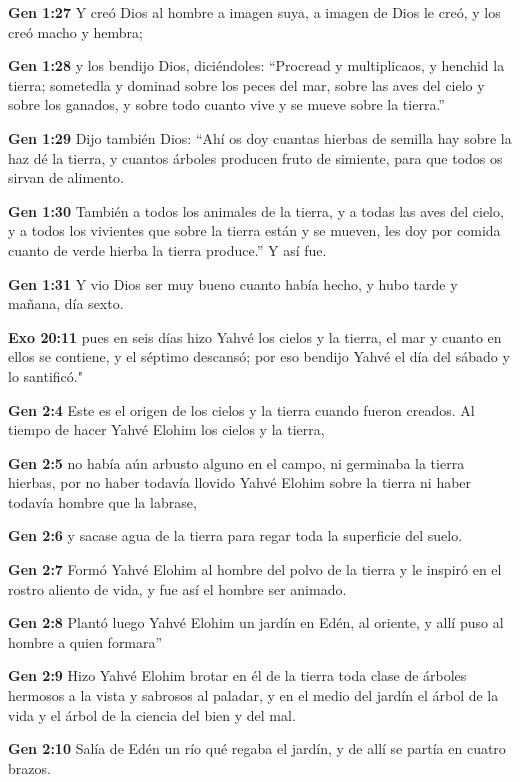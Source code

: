 \textbf{Gen 1:27} Y creó Dios al hombre a imagen suya, a imagen de Dios le creó, y los creó macho y hembra; 

\textbf{Gen 1:28} y los bendijo Dios, diciéndoles: “Procread y multiplicaos, y henchid la tierra; sometedla y dominad sobre los peces del mar, sobre las aves del cielo y sobre los ganados, y sobre todo cuanto vive y se mueve sobre la tierra.” 

\textbf{Gen 1:29} Dijo también Dios: “Ahí os doy cuantas hierbas de semilla hay sobre la haz dé la tierra, y cuantos árboles producen fruto de simiente, para que todos os sirvan de alimento. 

\textbf{Gen 1:30} También a todos los animales de la tierra, y a todas las aves del cielo, y a todos los vivientes que sobre la tierra están y se mueven, les doy por comida cuanto de verde hierba la tierra produce.” Y así fue. 

\textbf{Gen 1:31} Y vio Dios ser muy bueno cuanto había hecho, y hubo tarde y mañana, día sexto. 

\textbf{Exo 20:11} pues en seis días hizo Yahvé los cielos y la tierra, el mar y cuanto en ellos se contiene, y el séptimo descansó; por eso bendijo Yahvé el día del sábado y lo santificó." 




\textbf{Gen 2:4} Este es el origen de los cielos y la tierra cuando fueron creados. Al tiempo de hacer Yahvé Elohim los cielos y la tierra, 

\textbf{Gen 2:5} no había aún arbusto alguno en el campo, ni germinaba la tierra hierbas, por no haber todavía llovido Yahvé Elohim sobre la tierra ni haber todavía hombre que la labrase, 

\textbf{Gen 2:6} y sacase agua de la tierra para regar toda la superficie del suelo. 

\textbf{Gen 2:7} Formó Yahvé Elohim al hombre del polvo de la tierra y le inspiró en el rostro aliento de vida, y fue así el hombre ser animado. 

\textbf{Gen 2:8} Plantó luego Yahvé Elohim un jardín en Edén, al oriente, y allí puso al hombre a quien formara” 

\textbf{Gen 2:9} Hizo Yahvé Elohim brotar en él de la tierra toda clase de árboles hermosos a la vista y sabrosos al paladar, y en el medio del jardín el árbol de la vida y el árbol de la ciencia del bien y del mal. 

\textbf{Gen 2:10} Salía de Edén un río qué regaba el jardín, y de allí se partía en cuatro brazos. 

